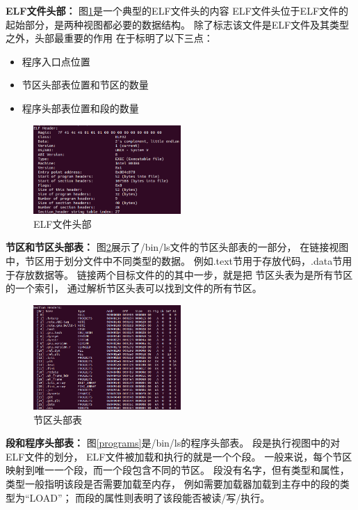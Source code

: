 \textbf{ELF文件头部：}
图\ref{header}是一个典型的ELF文件头的内容
ELF文件头位于ELF文件的起始部分，是两种视图都必要的数据结构。
除了标志该文件是ELF文件及其类型之外，头部最重要的作用
在于标明了以下三点：

\begin{itemize}
  \item 程序入口点位置
  \item 节区头部表位置和节区的数量
  \item 程序头部表位置和段的数量 
\end{itemize}

\begin{figure}[h!]
  \centering
  \includegraphics[width=0.5\textwidth]{figure/header.png}
  \caption{ELF文件头部}
  \label{header}
\end{figure}

\textbf{节区和节区头部表：}
图\ref{sections}展示了/bin/ls文件的节区头部表的一部分，
在链接视图中，节区用于划分文件中不同类型的数据。
例如.text节用于存放代码，.data节用于存放数据等。
链接两个目标文件的的其中一步，就是把
节区头表为是所有节区的一个索引，
通过解析节区头表可以找到文件的所有节区。

\begin{figure}[h!]
  \centering
  \includegraphics[width=0.5\textwidth]{figure/sections.png}
  \caption{节区头部表}
  \label{sections}
\end{figure}

\textbf{段和程序头部表：}
图\ref{programs}是/bin/ls的程序头部表。
段是执行视图中的对ELF文件的划分，
ELF文件被加载和执行的就是一个个段。
一般来说，每个节区映射到唯一一个段，而一个段包含不同的节区。
段没有名字，但有类型和属性，
类型一般指明该段是否需要加载至内存，
例如需要加载器加载到主存中的段的类型为“LOAD”；
而段的属性则表明了该段能否被读/写/执行。

